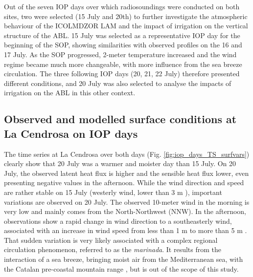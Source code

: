 Out of the seven IOP days over which radiosoundings were conducted on both sites, two were selected (15 July and 20th) to further investigate the atmospheric behaviour of the ICOLMDZOR LAM and the impact of irrigation on the vertical structure of the ABL. 
15 July was selected as a representative IOP day for the beginning of the SOP, showing similarities with observed profiles on the 16 and 17 July. As the SOP progressed, 2-meter temperature increased and the wind regime became much more changeable, with more influence from the sea breeze circulation.
The three following IOP days (20, 21, 22 July) therefore presented different conditions, and 20 July was also selected to analyse the impacts of irrigation on the ABL in this other context.

\subsection{Observed and modelled surface conditions at La Cendrosa on IOP days}

The time series at La Cendrosa over both days (Fig. \ref{fig:iop_days_TS_surfvars}) clearly show that 20 July was a warmer and moister day than 15 July.
On 20 July, the observed latent heat flux is higher and the sensible heat flux lower, even presenting negative values in the afternoon.
While the wind direction and speed are rather stable on 15 July (westerly wind, lower than 3 m \persec), important variations are observed on 20 July.
The observed 10-meter wind in the morning is very low and mainly comes from the North-Northwest (NNW). 
In the afternoon, observations show a rapid change in wind direction to a southeasterly wind, associated with an increase in wind speed from less than 1 m \persec to more than 5 m \persec. That sudden variation is very likely associated with a complex regional circulation phenomenon, referred to as the \textit{marinada}. It results from the interaction of a sea breeze, bringing moist air from the Mediterranean sea, with the Catalan pre-coastal mountain range \citep{lunel_marinada_2024}, but is out of the scope of this study.

\hfill

